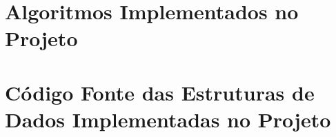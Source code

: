 \documentclass[a4paper,12pt]{article}
\begin{document}
\newpage
\appendix
\begin{appendices}


\label{App:AppendixA}
\chapter{Algoritmos Implementados no Projeto}
 










\chapter{Código Fonte das Estruturas de Dados Implementadas no Projeto}




\end{appendices}



\end{document}
